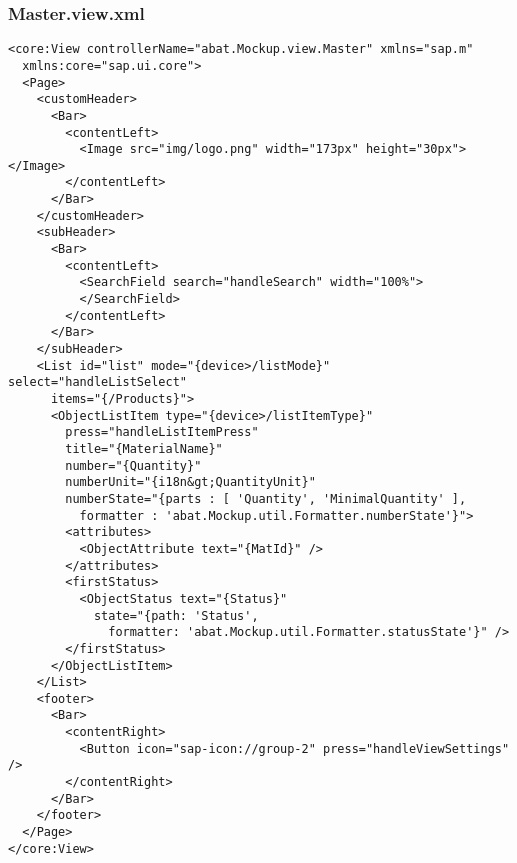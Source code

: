 \newpage
\subsubsection*{Master.view.xml}
\begin{lstlisting}[frame=htrbl, label=lst:Master.view.xml]
<core:View controllerName="abat.Mockup.view.Master" xmlns="sap.m"
  xmlns:core="sap.ui.core">
  <Page>
    <customHeader>
      <Bar>
        <contentLeft>
          <Image src="img/logo.png" width="173px" height="30px"></Image>
        </contentLeft>
      </Bar>
    </customHeader>
    <subHeader>
      <Bar>
        <contentLeft>
          <SearchField search="handleSearch" width="100%">
          </SearchField>
        </contentLeft>
      </Bar>
    </subHeader>
    <List id="list" mode="{device>/listMode}" select="handleListSelect"
      items="{/Products}">
      <ObjectListItem type="{device>/listItemType}"
        press="handleListItemPress"
        title="{MaterialName}"
        number="{Quantity}"
        numberUnit="{i18n&gt;QuantityUnit}"
        numberState="{parts : [ 'Quantity', 'MinimalQuantity' ],
          formatter : 'abat.Mockup.util.Formatter.numberState'}">
        <attributes>
          <ObjectAttribute text="{MatId}" />
        </attributes>
        <firstStatus>
          <ObjectStatus text="{Status}"
            state="{path: 'Status',
              formatter: 'abat.Mockup.util.Formatter.statusState'}" />
        </firstStatus>
      </ObjectListItem>
    </List>
    <footer>
      <Bar>
        <contentRight>
          <Button icon="sap-icon://group-2" press="handleViewSettings" />
        </contentRight>
      </Bar>
    </footer>
  </Page>
</core:View>
\end{lstlisting}

\newpage

